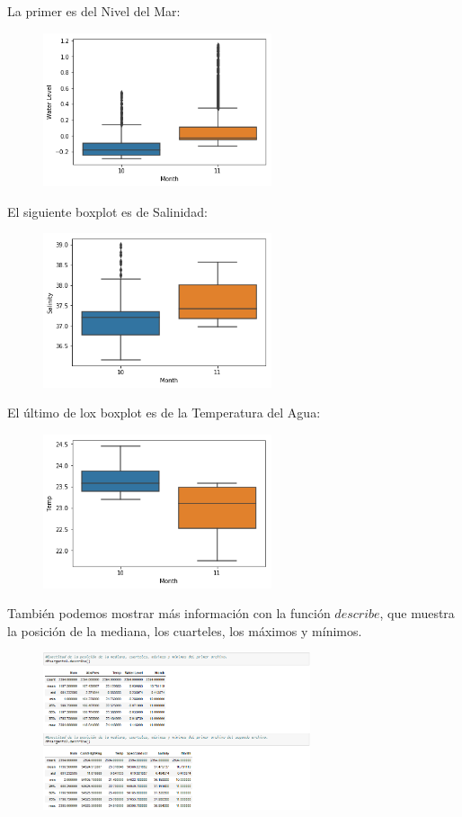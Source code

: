 \documentclass[a4paper]{article}
\begin{document}
La primer es del Nivel del Mar:
\begin{figure}[ht!]
 \centering
  \includegraphics[width=0.6\textwidth]{Boxplot1.png}
\end{figure}

El siguiente boxplot es de Salinidad:
\begin{figure}[ht!]
 \centering
  \includegraphics[width=0.6\textwidth]{Boxplot2.png}
\end{figure}

\pagebreak
El último de lox boxplot es de la Temperatura del Agua:
\begin{figure}[ht!]
 \centering
  \includegraphics[width=0.6\textwidth]{Boxplot3.png}
\end{figure}

También podemos mostrar más información con la función $describe$, que muestra la posición de la mediana, los cuarteles, los máximos y mínimos. 
\begin{figure}[ht!]
 \centering
  \includegraphics[width=0.7\textwidth]{Describe.PNG}
\end{figure}
\end{document}

